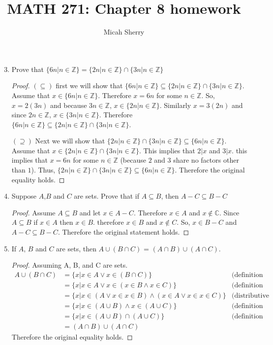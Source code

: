 \documentclass{article}
\title{MATH 271: Chapter 8 homework}
\author{Micah Sherry}
\newcommand{\Z}{\mathbb{Z}}
\newcommand{\C}{\mathbb{C}}
\newcommand{\nitem}[1] %
{
	\setcounter{enumi}{#1}
	\addtocounter{enumi}{-1}
	\item
}
\begin{document}
	\maketitle
	
	\begin{enumerate}
		\nitem{2} Prove that $\{6n | n \in \Z \} = \{2n | n \in \Z \} \cap \{3n | n \in \Z \}$
		\begin{proof}
			$(\subseteq)$ first we will show that $\{6n | n \in \Z \} \subseteq \{2n | n \in \Z \} \cap \{3n | n \in \Z \}$. \\
			Assume that $x \in \{6n | n \in \Z \}$. Therefore $x = 6n$ for some $n \in \Z$. So, $x = 2(3n)$ and because $3n \in \Z$, $x \in \{2n | n \in \Z \}$. Similarly $x=3(2n)$ and since $2n \in \Z$,  $x \in \{3n | n \in \Z \}$.
			Therefore $\{6n | n \in \Z \} \subseteq \{2n | n \in \Z \} \cap \{3n | n \in \Z \}$.
			
			$(\supseteq)$ Next we will show that $\{2n | n \in \Z \} \cap \{3n | n \in \Z \} \subseteq \{6n | n \in \Z \}$. \\
			Assume that $x \in \{2n | n \in \Z \} \cap \{3n | n \in \Z \}$. This implies that $2|x$ and $3|x$.
			this implies that $x = 6n$ for some $n \in \Z$ (because $2$ and $3$ share no factors other than $1$). Thus, $\{2n | n \in \Z \} \cap \{3n | n \in \Z \} \subseteq \{6n | n \in \Z \}$. Therefore the original equality holds. 
		\end{proof}
		
		\nitem{6} Suppose $A$,$B$ and $C$ are sets. Prove that if $A \subseteq B$, then $A -C \subseteq B-C$
		\begin{proof}
			Assume $A \subseteq B$ and let $x \in  A - C$. Therefore $x \in A$ and $x \not\in \C$. Since $A \subseteq B$ if $x \in A$ then $x \in B$. therefore $x \in B $ and $x \not\in C$. So, $x \in B-C$ and $A -C \subseteq B-C$. Therefore the original statement holds.
			
		\end{proof}
		
		\nitem{8} If $A$, $B$ and $C$ are sets, then $A \cup (B \cap C)$ = $(A \cap B)\cup  (A \cap C)$. 
		\begin{proof}
			
			Assuming  A, B, and C are sets.
			\begin{align*}
				A \cup (B \cap C) &= \{x| x \in A \vee x \in (B \cap C)\} & \text{(definition of union)}\\
				&= \{x| x \in A \vee x \in (x \in B \wedge x \in C)\} & \text{(definition of intersection)}\\
				&= \{x| x \in (A \vee x \in x \in B) \wedge(x \in A \vee x \in x \in C)\} & \text{(distributive property)}\\
				&= \{x| x \in (A \cup B) \wedge x \in( A \cup C)\} & \text{(definition of union)}\\
				&= \{x| x \in (A \cup B) \cap ( A \cup C)\} & \text{(definition of union)}\\
				&=(A \cap B)\cup  (A \cap C)
			\end{align*}
			Therefore the original equality holds.
		\end{proof}
		

\end{enumerate}
\end{document}
